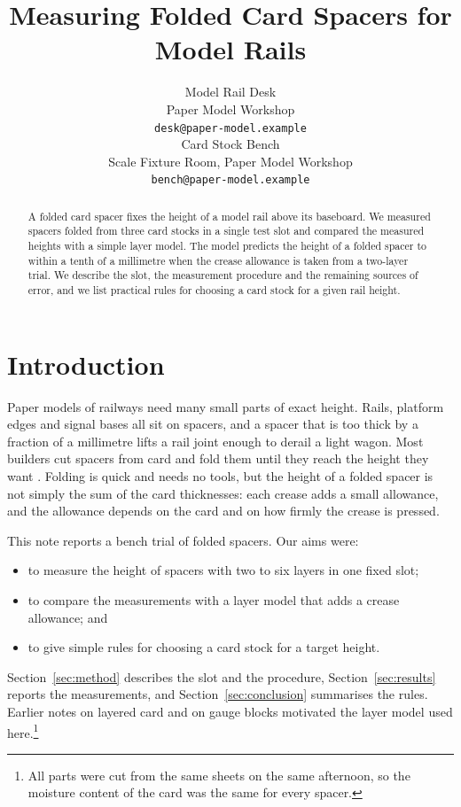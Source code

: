 \documentclass{article}
\title{Measuring Folded Card Spacers for Model Rails}
\author{%
  Model Rail Desk \\
  Paper Model Workshop \\
  \texttt{desk@paper-model.example} \\
  \And
  Card Stock Bench \\
  Scale Fixture Room, Paper Model Workshop \\
  \texttt{bench@paper-model.example} \\
}
\begin{document}
\maketitle

\begin{abstract}
A folded card spacer fixes the height of a model rail above its baseboard.
We measured spacers folded from three card stocks in a single test slot and
compared the measured heights with a simple layer model. The model predicts the
height of a folded spacer to within a tenth of a millimetre when the crease
allowance is taken from a two-layer trial. We describe the slot, the measurement
procedure and the remaining sources of error, and we list practical rules for
choosing a card stock for a given rail height.
\end{abstract}

\section{Introduction}\label{sec:intro}
Paper models of railways need many small parts of exact height. Rails,
platform edges and signal bases all sit on spacers, and a spacer that is too
thick by a fraction of a millimetre lifts a rail joint enough to derail a light
wagon. Most builders cut spacers from card and fold them until they reach the
height they want \citep{desk25}. Folding is quick and needs no tools, but the
height of a folded spacer is not simply the sum of the card thicknesses: each
crease adds a small allowance, and the allowance depends on the card and on how
firmly the crease is pressed.

This note reports a bench trial of folded spacers. Our aims were:
\begin{itemize}
\item to measure the height of spacers with two to six layers in one fixed slot;
\item to compare the measurements with a layer model that adds a crease allowance; and
\item to give simple rules for choosing a card stock for a target height.
\end{itemize}
Section~\ref{sec:method} describes the slot and the procedure, Section~\ref{sec:results}
reports the measurements, and Section~\ref{sec:conclusion} summarises the rules.
Earlier notes on layered card \citep{bench24} and on gauge blocks
\citep{scale23} motivated the layer model used here.\footnote{All parts were
cut from the same sheets on the same afternoon, so the moisture content of the
card was the same for every spacer.}
\end{document}
